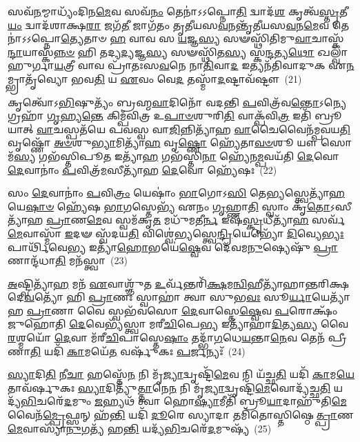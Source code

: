 𑌸𑌵᳴\-\ul{𑌨}\-𑌮𑍍𑌮𑌾𑌧𑍍𑌯𑌂᳴𑌦𑌿𑌨\-\ul{𑌮𑍇}\-𑌵 𑌸𑌵᳴\-\ul{𑌨𑌂} 𑌤𑍇𑌨𑌾॑𑌽𑌽𑌪𑍍𑌨𑍋\-\ul{𑌤𑌿} 𑌦𑍍𑌵𑌾𑌦᳴\-\ul{𑌶} 𑌕𑍃𑌤𑍍𑌵᳴\-\ul{𑌸𑍍𑌤𑍃}\-𑌤𑍀\-\ul{𑌯𑌂} 𑌦𑍍𑌵𑌾𑌦᳴𑌶𑌾𑌕𑍍𑌷\-\ul{𑌰𑌾} 𑌜𑌗᳴\-\ul{𑌤𑍀} 𑌜𑌾𑌗᳴𑌤𑌂 𑌤𑍃𑌤𑍀𑌯𑌸\-\ul{𑌵}\-𑌨𑌨𑍍𑌤𑍃᳴𑌤𑍀𑌯𑌸\-\ul{𑌵}\-𑌨\-\ul{𑌮𑍇}\-𑌵 𑌤𑍇𑌨𑌾॑𑌽𑌽𑌪𑍍𑌨𑍋\-\ul{𑌤𑍍𑌯𑍇}\-𑌤𑌾𑍞 \ul{𑌹} 𑌵𑌾𑌵 𑌸 \ul{𑌯}\-𑌜𑍍𑌞\-\ul{𑌸𑍍𑌯} 𑌸𑍟𑌸𑍍𑌥𑌿᳴𑌤𑌿𑌮𑍁\-\ul{𑌵𑌾}\-𑌚𑌾𑌸𑍍𑌕᳴\-\ul{𑌨𑍍𑌦𑌾}\-𑌯𑌾𑌸𑍍𑌕᳴\-\ul{𑌨𑍍𑌨}\-\-\ul{𑍞} 𑌹𑌿 𑌤𑌦𑍍𑌯\-\ul{𑌦𑍍𑌯}\-𑌜𑍍𑌞\-\ul{𑌸𑍍𑌯} 𑌸𑍟𑌸𑍍𑌥𑌿᳴𑌤\-\ul{𑌸𑍍𑌯} 𑌸𑍍𑌕\-\ul{𑌨𑍍𑌦}\-𑌤𑍍𑌯\-\ul{𑌥𑍋} 𑌖𑌲𑍍𑌵𑌾᳴𑌹𑍁𑌰𑍍𑌗𑌾\-\ul{𑌯}\-𑌤𑍍𑌰𑍀 𑌵𑌾𑌵 𑌪𑍍𑌰𑌾᳴𑌤𑌃𑌸\-\ul{𑌵}\-𑌨𑍇 𑌨𑌾\-\ul{𑌤𑌿}\-𑌵𑌾\-\ul{𑌦} 𑌇𑌤𑍍𑌯𑌨᳴𑌤𑌿𑌵𑌾𑌦𑍁𑌕 𑌏\-\ul{𑌨}\-𑌮𑍍𑌭𑍍𑌰𑌾𑌤𑍃᳴𑌵𑍍𑌯𑍋 𑌭𑌵\-\ul{𑌤𑌿} 𑌯 \ul{𑌏}\-𑌵𑌂 𑌵𑍇\-\ul{𑌦} 𑌤𑌸𑍍𑌮𑌾᳴\-\ul{𑌦}\-𑌷𑍍𑌟𑌾𑌵᳴𑌷𑍍𑌟𑍗~(21)

𑌕𑍃𑌤𑍍𑌵𑍋᳴\-𑌽\-\ul{𑌭𑌿}\-𑌷𑍁𑌤𑍍𑌯𑌂᳴ 𑌬𑍍𑌰𑌹𑍍𑌮\-\ul{𑌵𑌾}\-𑌦𑌿𑌨𑍋᳴ 𑌵𑌦𑌨𑍍𑌤𑌿 \ul{𑌪}\-𑌵𑌿𑌤𑍍𑌰᳴𑌵\-\ul{𑌨𑍍𑌤𑍋}\-\-𑌽𑌨𑍍𑌯𑍇 𑌗𑍍𑌰𑌹𑌾᳴ \ul{𑌗𑍃}\-𑌹𑍍𑌯\-\ul{𑌨𑍍𑌤𑍇} 𑌕𑌿𑌮𑍍𑌪᳴𑌵𑌿𑌤𑍍𑌰 𑌉\-\ul{𑌪𑌾}\-\-\ul{𑍞}\-𑌶𑍁𑌰𑌿\-\ul{𑌤𑌿} 𑌵𑌾𑌕𑍍𑌪᳴𑌵𑌿\-\ul{𑌤𑍍𑌰} 𑌇𑌤𑌿᳴ 𑌬𑍍𑌰𑍂𑌯𑌾𑌤𑍍 \ul{𑌵𑌾}\-𑌚𑌸𑍍𑌪𑌤᳴𑌯𑍇 𑌪𑌵𑌸𑍍𑌵 𑌵𑌾\-\ul{𑌜𑌿}\-𑌨𑍍𑌨𑌿𑌤𑍍𑌯𑌾᳴𑌹 \ul{𑌵𑌾}\-𑌚𑍈𑌵𑍈𑌨᳴𑌮𑍍𑌪𑌵𑌯\-\ul{𑌤𑌿} 𑌵𑍃𑌷𑍍𑌣𑍋᳴ \ul{𑌅}\-\-\ul{𑍞}\-𑌶𑍁\-\ul{𑌭𑍍𑌯𑌾}\-𑌮𑌿𑌤𑍍𑌯𑌾᳴\-\ul{𑌹} 𑌵𑍃\-\ul{𑌷𑍍𑌣𑍋} 𑌹𑍍𑌯𑍇᳴𑌤𑌾\-\ul{𑌵}\-\-\ul{𑍞}\-𑌶𑍂 𑌯𑍗 𑌸𑍋𑌮᳴\-\ul{𑌸𑍍𑌯} 𑌗𑌭᳴𑌸𑍍𑌤𑌿𑌪𑍂\-\ul{𑌤} 𑌇𑌤𑍍𑌯𑌾᳴\-\ul{𑌹} 𑌗𑌭᳴𑌸𑍍𑌤𑌿\-\ul{𑌨𑌾} 𑌹𑍍𑌯𑍇᳴𑌨\-\ul{𑌮𑍍𑌪}\-𑌵𑌯᳴𑌤𑌿 \ul{𑌦𑍇}\-𑌵𑍋 \ul{𑌦𑍇}\-𑌵𑌾𑌨𑌾𑌂॑ \ul{𑌪}\-𑌵𑌿𑌤𑍍𑌰᳴\-\ul{𑌮}\-𑌸𑍀𑌤𑍍𑌯𑌾᳴𑌹 \ul{𑌦𑍇}\-𑌵𑍋 𑌹𑍍𑌯𑍇᳴𑌷𑌃~(22)

𑌸𑌂 \ul{𑌦𑍇}\-𑌵𑌾𑌨𑌾𑌂॑ \ul{𑌪}\-𑌵𑌿\-\ul{𑌤𑍍𑌰𑌂} 𑌯𑍇𑌷𑌾𑌂॑ \ul{𑌭𑌾}\-𑌗𑍋\-𑌽\-\ul{𑌸𑌿} 𑌤𑍇\-\ul{𑌭𑍍𑌯}\-𑌸𑍍𑌤𑍍𑌵𑍇𑌤𑍍𑌯𑌾᳴\-\ul{𑌹} 𑌯𑍇\-\ul{𑌷𑌾}\-\-\ul{𑍞} 𑌹𑍍𑌯𑍇᳴𑌷 \ul{𑌭𑌾}\-𑌗𑌸𑍍𑌤𑍇𑌭𑍍𑌯᳴ 𑌏𑌨𑌂 \ul{𑌗𑍃}\-𑌹𑍍𑌣𑌾\-\ul{𑌤𑌿} 𑌸𑍍𑌵𑌾𑌂 𑌕𑍃᳴\-\ul{𑌤𑍋}\-\-𑌽𑌸𑍀𑌤𑍍𑌯𑌾᳴𑌹 \ul{𑌪𑍍𑌰𑌾}\-𑌣\-\ul{𑌮𑍇}\-𑌵 𑌸𑍍𑌵𑌮᳴𑌕𑍃\-\ul{𑌤} 𑌮𑌧𑍁᳴𑌮𑌤𑍀\-\ul{𑌰𑍍𑌨} 𑌇𑌷᳴\-\ul{𑌸𑍍𑌕𑍃}\-𑌧𑍀𑌤𑍍𑌯𑌾᳴\-\ul{𑌹} 𑌸𑌰𑍍𑌵᳴\-\ul{𑌮𑍇}\-𑌵𑌾𑌸𑍍𑌮𑌾᳴ \ul{𑌇}\-𑌦𑍟 𑌸𑍍𑌵᳴𑌦𑌯\-\ul{𑌤𑌿} 𑌵𑌿𑌶𑍍𑌵𑍇॑𑌭𑍍𑌯𑌸𑍍𑌤𑍍𑌵𑍇\-\ul{𑌨𑍍𑌦𑍍𑌰𑌿}\-𑌯𑍇𑌭𑍍𑌯𑍋᳴ \ul{𑌦𑌿}\-𑌵𑍍𑌯𑍇\-\ul{𑌭𑍍𑌯𑌃} 𑌪𑌾𑌰𑍍𑌥𑌿᳴𑌵𑍇\-\ul{𑌭𑍍𑌯} 𑌇𑌤𑍍𑌯𑌾᳴\-\ul{𑌹𑍋}\-𑌭𑌯𑍇॑\-\ul{𑌷𑍍𑌵𑍇}\-𑌵 𑌦𑍇᳴𑌵𑌮\-\ul{𑌨𑍁}\-𑌷𑍍𑌯𑍇𑌷𑍁᳴ \ul{𑌪𑍍𑌰𑌾}\-𑌣𑌾𑌨𑍍𑌦᳴𑌧𑌾\-\ul{𑌤𑌿} 𑌮𑌨᳴𑌸𑍍𑌤𑍍𑌵𑌾~(23)

\-\ul{𑌅}\-𑌷𑍍𑌟𑍍𑌵𑌿𑌤𑍍𑌯𑌾᳴\-\ul{𑌹} 𑌮𑌨᳴ \ul{𑌏}\-𑌵𑌾𑌶𑍍𑌞𑍁᳴𑌤 \ul{𑌉}\-𑌰𑍍𑌵᳴𑌨𑍍𑌤𑌰𑌿᳴\-\ul{𑌕𑍍𑌷}\-𑌮\-\ul{𑌨𑍍𑌵𑌿}\-𑌹𑍀𑌤𑍍𑌯𑌾᳴𑌹𑌾𑌨𑍍𑌤𑌰𑌿𑌕𑍍𑌷𑌦𑍇\-\ul{𑌵}\-𑌤𑍍𑌯𑍋᳴ 𑌹𑌿 \ul{𑌪𑍍𑌰𑌾}\-𑌣𑌃 𑌸𑍍𑌵𑌾𑌹𑌾॑ 𑌤𑍍𑌵𑌾 𑌸𑍁𑌭\-\ul{𑌵𑌃} 𑌸𑍂\-\ul{𑌰𑍍𑌯𑌾}\-𑌯𑍇𑌤𑍍𑌯𑌾᳴𑌹 \ul{𑌪𑍍𑌰𑌾}\-𑌣𑌾 𑌵𑍈 𑌸𑍍𑌵𑌭᳴𑌵𑌸𑍋 \ul{𑌦𑍇}\-𑌵𑌾𑌸𑍍𑌤𑍇\-\ul{𑌷𑍍𑌵𑍇}\-𑌵 \ul{𑌪}\-𑌰𑍋𑌕𑍍𑌷𑌂᳴ 𑌜𑍁𑌹𑍋𑌤𑌿 \ul{𑌦𑍇}\-𑌵𑍇𑌭𑍍𑌯᳴𑌸𑍍𑌤𑍍𑌵𑌾 𑌮𑌰𑍀\-\ul{𑌚𑌿}\-𑌪𑍇\-\ul{𑌭𑍍𑌯} 𑌇𑌤𑍍𑌯𑌾᳴𑌹𑌾\-\ul{𑌦𑌿}\-𑌤𑍍𑌯\-\ul{𑌸𑍍𑌯} 𑌵𑍈 \ul{𑌰}\-𑌶𑍍𑌮𑌯𑍋᳴ \ul{𑌦𑍇}\-𑌵𑌾 𑌮᳴𑌰𑍀\-\ul{𑌚𑌿}\-𑌪𑌾𑌸𑍍𑌤𑍇\-\ul{𑌷𑌾𑌂} 𑌤𑌦𑍍𑌭𑌾᳴\-\ul{𑌗}\-𑌧𑍇\-\ul{𑌯}\-𑌨𑍍𑌤𑌾\-\ul{𑌨𑍇}\-𑌵 𑌤𑍇𑌨᳴ 𑌪𑍍𑌰𑍀𑌣𑌾\-\ul{𑌤𑌿} 𑌯𑌦𑌿᳴ \ul{𑌕𑌾}\-𑌮𑌯𑍇᳴\-\ul{𑌤} 𑌵𑌰𑍍\mbox{}𑌷𑍁᳴𑌕𑌃 \ul{𑌪}\-𑌰𑍍𑌜𑌨𑍍𑌯𑌃᳴~(24)

\-\ul{𑌸𑍍𑌯𑌾}\-𑌦𑌿\-\ul{𑌤𑌿} 𑌨𑍀\-\ul{𑌚𑌾} 𑌹𑌸𑍍𑌤𑍇᳴\-\ul{𑌨} 𑌨𑌿 𑌮𑍃᳴\-\ul{𑌜𑍍𑌯𑌾}\-𑌦𑍍𑌵𑍃𑌷𑍍𑌟𑌿᳴\-\ul{𑌮𑍇}\-𑌵 𑌨𑌿 𑌯᳴𑌚𑍍𑌛\-\ul{𑌤𑌿} 𑌯𑌦𑌿᳴ \ul{𑌕𑌾}\-𑌮\-\ul{𑌯𑍇}\-𑌤𑌾𑌵᳴𑌰𑍍\mbox{}𑌷𑍁𑌕𑌃 \ul{𑌸𑍍𑌯𑌾}\-𑌦𑌿𑌤𑍍𑌯𑍁᳴\-\ul{𑌤𑍍𑌤𑌾}\-𑌨𑍇\-\ul{𑌨} 𑌨𑌿 𑌮𑍃᳴\-\ul{𑌜𑍍𑌯𑌾}\-𑌦𑍍𑌵𑍃𑌷𑍍𑌟𑌿᳴\-\ul{𑌮𑍇}\-𑌵𑍋𑌦𑍍𑌯᳴𑌚𑍍𑌛\-\ul{𑌤𑌿} 𑌯𑌦𑍍𑌯᳴\-\ul{𑌭𑌿}\-𑌚𑌰𑍇᳴\-\ul{𑌦}\-𑌮𑍁𑌂 \ul{𑌜}\-𑌹𑍍𑌯𑌥᳴ 𑌤𑍍𑌵𑌾 𑌹𑍋\-\ul{𑌷𑍍𑌯𑌾}\-𑌮𑍀𑌤𑌿᳴ 𑌬𑍍𑌰𑍂\-\ul{𑌯𑌾}\-𑌦𑌾𑌹𑍁᳴𑌤𑌿\-\ul{𑌮𑍇}\-𑌵𑍈𑌨᳴\-\ul{𑌮𑍍𑌪𑍍𑌰𑍇}\-𑌫𑍍𑌸𑌨𑍍 𑌹᳴\-\ul{𑌨𑍍𑌤𑌿} 𑌯𑌦𑌿᳴ \ul{𑌦𑍂}\-𑌰𑍇 𑌸𑍍𑌯𑌾𑌦𑌾 𑌤𑌮𑌿᳴𑌤𑍋𑌸𑍍𑌤𑌿𑌷𑍍𑌠𑍇\-\ul{𑌤𑍍𑌪𑍍𑌰𑌾}\-𑌣\-\ul{𑌮𑍇}\-𑌵𑌾𑌸𑍍𑌯𑌾᳴\-\ul{𑌨𑍁}\-𑌗𑌤𑍍𑌯᳴ 𑌹\-\ul{𑌨𑍍𑌤𑌿} 𑌯𑌦𑍍𑌯᳴\-\ul{𑌭𑌿}\-𑌚𑌰𑍇᳴\-\ul{𑌦}\-𑌮𑍁𑌷𑍍𑌯᳴~(25)

